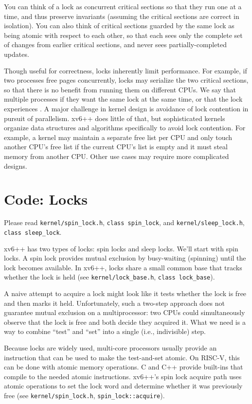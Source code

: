 You can think of a lock as
concurrent critical sections so that they run one at a time,
and thus preserve invariants (assuming the critical sections
are correct in isolation).
You can also think of critical sections guarded by the same lock as being
atomic with respect to each other,
so that each sees only the complete set of
changes from earlier critical sections, and never sees
partially-completed updates.

Though useful for correctness, locks inherently
limit performance. For example, if two processes free pages
concurrently, locks may serialize the two critical sections,
so that there is no
benefit from running them on different CPUs. We say that multiple
processes  if they want the same lock at the same
time, or that the lock experiences . A major
challenge in kernel design is avoidance of lock contention
in pursuit of parallelism. xv6++ does
little of that, but sophisticated kernels organize
data structures and algorithms specifically to avoid lock contention.
For example, a kernel may maintain a separate free list per CPU and only touch
another CPU's free list if the current CPU's list is empty and it must steal
memory from another CPU. Other use cases may require more
complicated designs.

\section{Code: Locks}

Please read \texttt{kernel/spin\_lock.h}, \texttt{class spin\_lock},
and \texttt{kernel/sleep\_lock.h}, \texttt{class sleep\_lock}.

xv6++ has two types of locks: spin locks and sleep locks.
We'll start with spin locks.
A spin lock provides mutual exclusion by busy-waiting (spinning)
until the lock becomes available.
In xv6++, locks share a small common base that tracks whether the lock is held
(see \texttt{kernel/lock\_base.h}, \texttt{class lock\_base}).

A naive attempt to acquire a lock might look like it tests whether the lock
is free and then marks it held. Unfortunately, such a two-step approach does not
guarantee mutual exclusion on a multiprocessor: two CPUs could simultaneously
observe that the lock is free and both decide they acquired it.
What we need is a way to combine ``test'' and ``set'' into a single
(i.e., indivisible) step.

Because locks are widely used,
multi-core processors usually provide an instruction that
can be used to make the test-and-set atomic.
On RISC-V, this can be done with atomic memory operations.
C and C++ provide built-ins that compile to the needed atomic instructions.
xv6++'s spin lock acquire path uses atomic operations to set the lock word
and determine whether it was previously free
(see \texttt{kernel/spin\_lock.h}, \texttt{spin\_lock::acquire}).

